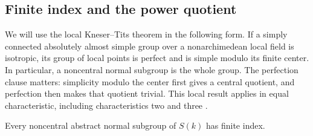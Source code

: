 \subsection{Finite index and the power quotient}

We will use the local Kneser--Tits theorem in the following form.  If a
simply connected absolutely almost simple group over a nonarchimedean
local field is isotropic, its group of local points is perfect and is
simple modulo its finite center.  In particular, a noncentral normal
subgroup is the whole group.  The perfection clause matters: simplicity
modulo the center first gives a central quotient, and perfection then
makes that quotient trivial.  This local result applies in equal
characteristic, including characteristics two and three
\cite{Tits,BruhatTitsIII,Gille}.

\begin{lemma}\label{arith:finite-index}
Every noncentral abstract normal subgroup of $S(k)$ has finite index.
\end{lemma}

